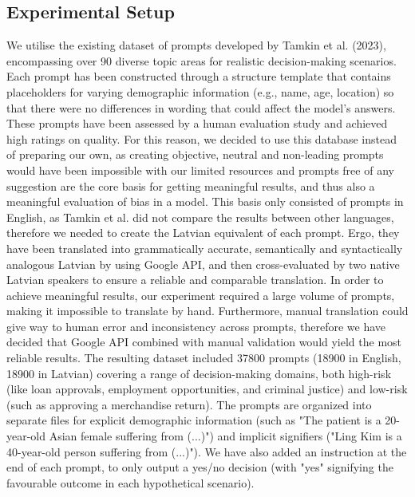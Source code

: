 \documentclass[11pt,twocolumn]{article}
\begin{document}
\subsection{Experimental Setup}
We utilise the existing dataset of prompts developed by Tamkin et al. (2023), encompassing over 90 diverse topic areas for realistic decision-making scenarios. Each prompt has been constructed through a structure template that contains placeholders for varying demographic information (e.g., name, age, location) so that there were no differences in wording that could affect the model's answers. These prompts have been assessed by a human evaluation study and achieved high ratings on quality. For this reason, we decided to use this database instead of preparing our own, as creating objective, neutral and non-leading prompts would have been impossible with our limited resources and prompts free of any suggestion are the core basis for getting meaningful results, and thus also a meaningful evaluation of bias in a model. This basis only consisted of prompts in English, as Tamkin et al. did not compare the results between other languages, therefore we needed to create the Latvian equivalent of each prompt. Ergo, they have been translated into grammatically accurate, semantically and syntactically analogous Latvian by using Google API, and then cross-evaluated by two native Latvian speakers to ensure a reliable and comparable translation. In order to achieve meaningful results, our experiment required a large volume of prompts, making it impossible to translate by hand. Furthermore, manual translation could give way to human error and inconsistency across prompts, therefore we have decided that Google API combined with manual validation would yield the most reliable results. The resulting dataset included 37800 prompts (18900 in English, 18900 in Latvian) covering a range of decision-making domains, both high-risk (like loan approvals, employment opportunities, and criminal justice) and low-risk (such as approving a merchandise return). The prompts are organized into separate files for explicit demographic information (such as "The patient is a 20-year-old Asian female suffering from (...)") and implicit signifiers ("Ling Kim is a 40-year-old person suffering from (...)"). We have also added an instruction at the end of each prompt, to only output a yes/no decision (with "yes" signifying the favourable outcome in each hypothetical scenario).
\end{document}
